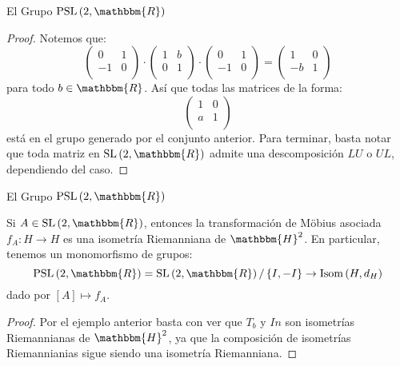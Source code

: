 \documentclass[xcolor=dvipsnames]{beamer}
\theoremstyle{largebreak}
\newcommand\cf[3]{\ensuremath{#1:#2\rightarrow#3}}
\newcommand{\bbm}[1]{\ensuremath{\mathbbm{#1}}}
\newcommand{\Isom}[1]{\ensuremath{\textup{Isom}\left(#1\right)}}
\newcommand{\SL}[1]{\ensuremath{\textup{SL}\left(#1\right)}}
\newcommand{\PSL}[1]{\ensuremath{\textup{PSL}\left(#1\right)}}
\begin{document}
\begin{frame}{El Grupo $\PSL{2,\bbm{R}}$}
    \begin{proof}
        Notemos que:
        \begin{equation*}
            \left(\begin{array}{cc}
                0 & 1 \\
                -1 & 0 \\
            \end{array} \right)\cdot\left(\begin{array}{cc}
                1 & b \\
                0 & 1 \\
            \end{array} \right)\cdot\left(\begin{array}{cc}
                0 & 1 \\
                -1 & 0 \\
            \end{array} \right)=\left(\begin{array}{cc}
                1 & 0 \\
                -b & 1 \\
            \end{array} \right)
        \end{equation*}
        para todo $b\in\bbm{R}$. Así que todas las matrices de la forma:
        \begin{equation*}
            \left(\begin{array}{cc}
                1 & 0 \\
                a & 1 \\
            \end{array} \right)
        \end{equation*}
        está en el grupo generado por el conjunto anterior. Para terminar, basta notar que toda matriz en $\SL{2,\bbm{R}}$ admite una descomposición $LU$ o $UL$, dependiendo del caso.
    \end{proof}
\end{frame}

\begin{frame}{El Grupo $\PSL{2,\bbm{R}}$}
    \begin{propo}
        Si $A\in\SL{2,\bbm{R}}$, entonces la transformación de Möbius asociada $\cf{f_A}{H}{H}$ es una isometría Riemanniana de $\bbm{H}^2$. En particular, tenemos un monomorfismo de grupos:
        \begin{equation*}
            \PSL{2,\bbm{R}}=\SL{2,\bbm{R}}/\left\{I,-I \right\}\rightarrow\Isom{H,d_H}
        \end{equation*}
        dado por $[A]\mapsto f_A$.
    \end{propo}

    \begin{proof}
        Por el ejemplo anterior basta con ver que $T_b$ y $In$ son isometrías Riemannianas de $\bbm{H}^2$, ya que la composición de isometrías Riemannianias sigue siendo una isometría Riemanniana.
    \end{proof}
\end{frame}
\end{document}
